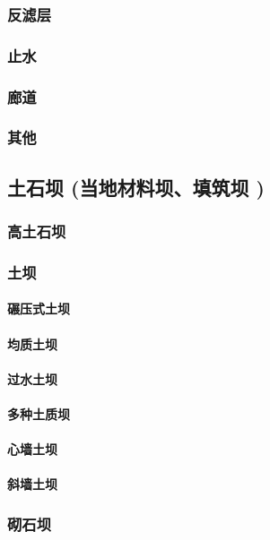 \documentclass[UTF8]{../../ApplicationUniverse}
\begin{document}
        \subsubsection{反滤层}
        \subsubsection{止水}
        \subsubsection{廊道}
        \subsubsection{其他}
    \subsection{土石坝 (当地材料坝、填筑坝 )}
        \subsubsection{高土石坝}
        \subsubsection{土坝}
            \paragraph{碾压式土坝}
            \paragraph{均质土坝}
            \paragraph{过水土坝}
            \paragraph{多种土质坝}
            \paragraph{心墙土坝}
            \paragraph{斜墙土坝}
        \subsubsection{砌石坝}
\end{document}
